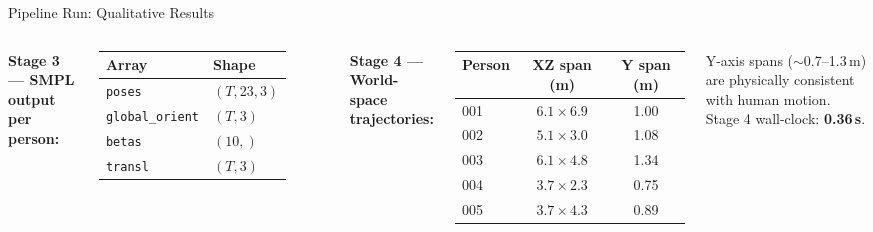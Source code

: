 \documentclass[aspectratio=169,11pt]{beamer}
\begin{document}
\begin{frame}{Pipeline Run: Qualitative Results}
\begin{columns}[T]
      \textbf{Stage 3 — SMPL output per person:}
      \vspace{0.3em}

      \begin{tabular}{ll}
        \toprule
        \textbf{Array} & \textbf{Shape} \\
        \midrule
        \texttt{poses}         & $(T, 23, 3)$ \\
        \texttt{global\_orient} & $(T, 3)$ \\
        \texttt{betas}         & $(10,)$ \\
        \texttt{transl}        & $(T, 3)$ \\
        \bottomrule
      \end{tabular}

      \vspace{0.6em}
      \textbf{Stage 4 — World-space trajectories:}
      \vspace{0.3em}

      \begin{tabular}{lcc}
        \toprule
        \textbf{Person} & \textbf{XZ span (m)} & \textbf{Y span (m)} \\
        \midrule
        001 & $6.1 \times 6.9$ & 1.00 \\
        002 & $5.1 \times 3.0$ & 1.08 \\
        003 & $6.1 \times 4.8$ & 1.34 \\
        004 & $3.7 \times 2.3$ & 0.75 \\
        005 & $3.7 \times 4.3$ & 0.89 \\
        \bottomrule
      \end{tabular}
      \vspace{0.3em}
      {\footnotesize Y-axis spans ($\sim$0.7--1.3\,m) are physically consistent with human motion. Stage 4 wall-clock: \textbf{0.36\,s}.}
  \end{columns}
\end{frame}
\end{document}
